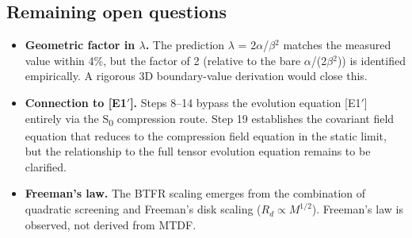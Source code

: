 \documentclass[11pt,a4paper]{article}
\begin{document}
\subsection{Remaining open questions}
\begin{itemize}
  \item \textbf{Geometric factor in $\lambda$.} The prediction $\lambda$ = 2$\alpha$/$\beta$$^{2}$ matches the measured value within 4\%, but the factor of 2 (relative to the bare $\alpha$/(2$\beta$$^{2}$)) is identified empirically. A rigorous 3D boundary-value derivation would close this.
  \item \textbf{Connection to [E1$'$].} Steps 8--14 bypass the evolution equation [E1$'$] entirely via the S\textsubscript{0} compression route. Step 19 establishes the covariant field equation that reduces to the compression field equation in the static limit, but the relationship to the full tensor evolution equation remains to be clarified.
  \item \textbf{Freeman's law.} The BTFR scaling emerges from the combination of quadratic screening and Freeman's disk scaling (\(R_d \propto M^{1/2}\)). Freeman's law is observed, not derived from MTDF.
\end{itemize}
\end{document}
